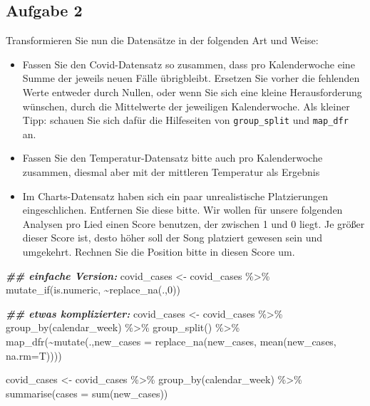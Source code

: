 \documentclass[
]{book}
\newenvironment{Shaded}{\begin{snugshade}}{\end{snugshade}}
\newcommand{\AttributeTok}[1]{\textcolor[rgb]{0.77,0.63,0.00}{#1}}
\newcommand{\DecValTok}[1]{\textcolor[rgb]{0.00,0.00,0.81}{#1}}
\newcommand{\DocumentationTok}[1]{\textcolor[rgb]{0.56,0.35,0.01}{\textbf{\textit{#1}}}}
\newcommand{\FunctionTok}[1]{\textcolor[rgb]{0.00,0.00,0.00}{#1}}
\newcommand{\NormalTok}[1]{#1}
\newcommand{\OtherTok}[1]{\textcolor[rgb]{0.56,0.35,0.01}{#1}}
\newcommand{\SpecialCharTok}[1]{\textcolor[rgb]{0.00,0.00,0.00}{#1}}
\begin{document}
\hypertarget{aufgabe-2-2}{%
\subsection{Aufgabe 2}\label{aufgabe-2-2}}

Transformieren Sie nun die Datensätze in der folgenden Art und Weise:

\begin{itemize}
\item
  Fassen Sie den Covid-Datensatz so zusammen, dass pro Kalenderwoche eine Summe der jeweils neuen Fälle übrigbleibt. Ersetzen Sie vorher die fehlenden Werte entweder durch Nullen, oder wenn Sie sich eine kleine Herausforderung wünschen, durch die Mittelwerte der jeweiligen Kalenderwoche. Als kleiner Tipp: schauen Sie sich dafür die Hilfeseiten von \texttt{group\_split} und \texttt{map\_dfr} an.
\item
  Fassen Sie den Temperatur-Datensatz bitte auch pro Kalenderwoche zusammen, diesmal aber mit der mittleren Temperatur als Ergebnis
\item
  Im Charts-Datensatz haben sich ein paar unrealistische Platzierungen eingeschlichen. Entfernen Sie diese bitte. Wir wollen für unsere folgenden Analysen pro Lied einen Score benutzen, der zwischen 1 und 0 liegt. Je größer dieser Score ist, desto höher soll der Song platziert gewesen sein und umgekehrt. Rechnen Sie die Position bitte in diesen Score um.
\end{itemize}

\hypertarget{solution2}{}
\begin{Shaded}
\begin{Highlighting}[]
\DocumentationTok{\#\# einfache Version:}
\NormalTok{covid\_cases }\OtherTok{\textless{}{-}}\NormalTok{ covid\_cases }\SpecialCharTok{\%\textgreater{}\%}
  \FunctionTok{mutate\_if}\NormalTok{(is.numeric, }\SpecialCharTok{\textasciitilde{}}\FunctionTok{replace\_na}\NormalTok{(.,}\DecValTok{0}\NormalTok{))}

\DocumentationTok{\#\# etwas komplizierter:}
\NormalTok{covid\_cases }\OtherTok{\textless{}{-}}\NormalTok{ covid\_cases }\SpecialCharTok{\%\textgreater{}\%}
  \FunctionTok{group\_by}\NormalTok{(calendar\_week) }\SpecialCharTok{\%\textgreater{}\%} 
  \FunctionTok{group\_split}\NormalTok{() }\SpecialCharTok{\%\textgreater{}\%} 
  \FunctionTok{map\_dfr}\NormalTok{(}\SpecialCharTok{\textasciitilde{}}\FunctionTok{mutate}\NormalTok{(.,}\AttributeTok{new\_cases =} \FunctionTok{replace\_na}\NormalTok{(new\_cases, }
                                           \FunctionTok{mean}\NormalTok{(new\_cases, }
                                                \AttributeTok{na.rm=}\NormalTok{T))))}

\NormalTok{covid\_cases }\OtherTok{\textless{}{-}}\NormalTok{ covid\_cases }\SpecialCharTok{\%\textgreater{}\%} 
  \FunctionTok{group\_by}\NormalTok{(calendar\_week) }\SpecialCharTok{\%\textgreater{}\%} 
  \FunctionTok{summarise}\NormalTok{(}\AttributeTok{cases =} \FunctionTok{sum}\NormalTok{(new\_cases))}
\end{Highlighting}
\end{Shaded}
\end{document}
